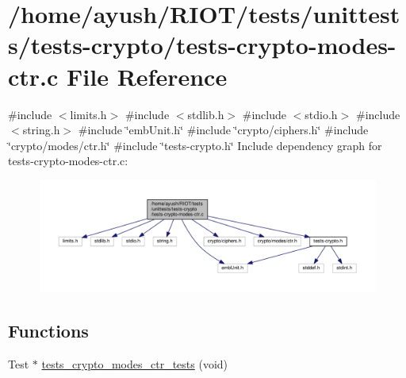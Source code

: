 \hypertarget{tests-crypto-modes-ctr_8c}{}\section{/home/ayush/\+R\+I\+O\+T/tests/unittests/tests-\/crypto/tests-\/crypto-\/modes-\/ctr.c File Reference}
\label{tests-crypto-modes-ctr_8c}
{\ttfamily \#include $<$limits.\+h$>$}\newline
{\ttfamily \#include $<$stdlib.\+h$>$}\newline
{\ttfamily \#include $<$stdio.\+h$>$}\newline
{\ttfamily \#include $<$string.\+h$>$}\newline
{\ttfamily \#include \char`\"{}emb\+Unit.\+h\char`\"{}}\newline
{\ttfamily \#include \char`\"{}crypto/ciphers.\+h\char`\"{}}\newline
{\ttfamily \#include \char`\"{}crypto/modes/ctr.\+h\char`\"{}}\newline
{\ttfamily \#include \char`\"{}tests-\/crypto.\+h\char`\"{}}\newline
Include dependency graph for tests-\/crypto-\/modes-\/ctr.c\+:
\nopagebreak
\begin{figure}[H]
\begin{center}
\leavevmode
\includegraphics[width=350pt]{tests-crypto-modes-ctr_8c__incl}
\end{center}
\end{figure}
\subsection*{Functions}
\begin{DoxyCompactItemize}
\item 
Test $\ast$ \hyperlink{group__unittests_ga504b19a263d14508528b1c378a3edee5}{tests\+\_\+crypto\+\_\+modes\+\_\+ctr\+\_\+tests} (void)
\end{DoxyCompactItemize}
